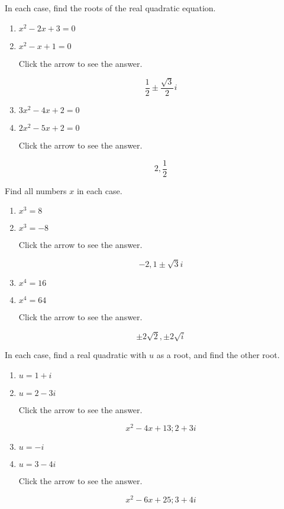 \documentclass{ximera}
\begin{document}
\begin{problem}\label{prb:A.4}
In each case, find the roots of the real quadratic equation.

\begin{enumerate}
\item  $x^{2} - 2x + 3 = 0$
\item  $x^{2} - x + 1 = 0$

Click the arrow to see the answer.
\begin{expandable}{}{}
$$ \frac{1}{2} \pm \frac{\sqrt{3}}{2}i$$
\end{expandable}

\item $3x^{2} - 4x + 2 = 0$
\item  $2x^{2} - 5x + 2 = 0$

Click the arrow to see the answer.
\begin{expandable}{}{}
$$ 2, \frac{1}{2}$$
\end{expandable}
\end{enumerate}
\end{problem}

\begin{problem}\label{prb:A.5}
Find all numbers $x$ in each case.

\begin{enumerate}
\item $x^{3} = 8$
\item $x^{3} = -8$

Click the arrow to see the answer.
\begin{expandable}{}{}
$$ -2, 1 \pm \sqrt{3}i$$
\end{expandable}

\item  $x^{4} = 16$
\item  $x^{4} = 64$

Click the arrow to see the answer.
\begin{expandable}{}{}
$$ \pm 2\sqrt{2}, \pm 2\sqrt{i}$$
\end{expandable}
\end{enumerate}
\end{problem}

\begin{problem}\label{prb:A.6}
In each case, find a real quadratic with $u$ as a root, and find the other root.

\begin{enumerate}
\item  $u = 1 + i$
\item  $u = 2 - 3i$

Click the arrow to see the answer.
\begin{expandable}{}{}
$$x^{2} - 4x + 13; 2 + 3i$$
\end{expandable}

\item $u = -i$
\item $u = 3 - 4i$

Click the arrow to see the answer.
\begin{expandable}{}{}
$$ x^{2} - 6x + 25; 3 + 4i$$
\end{expandable}
\end{enumerate}
\end{problem}
\end{document}
